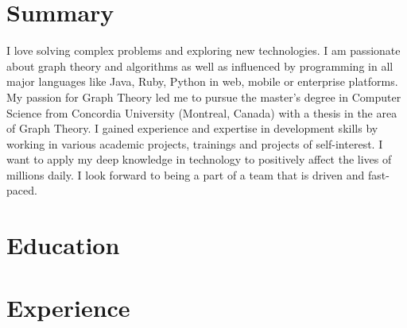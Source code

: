 \documentclass[11pt,a4paper,sans]{moderncv} %
\begin{document}
\makecvtitle %
\section{Summary}
I love solving complex problems and exploring new technologies. I am passionate about graph theory and algorithms as well as influenced by programming in all major languages like Java, Ruby, Python in web, mobile or enterprise platforms. My passion for Graph Theory led me to pursue the master's degree in Computer Science from Concordia University (Montreal, Canada) with a thesis in the area of Graph Theory. I gained experience and expertise in development skills by working in various academic projects, trainings and projects of self-interest. I want to apply my deep knowledge in technology to positively affect the lives of millions daily. I look forward to being a part of a team that is driven and fast-paced.


\section{Education}





\section{Experience}

\end{document}

